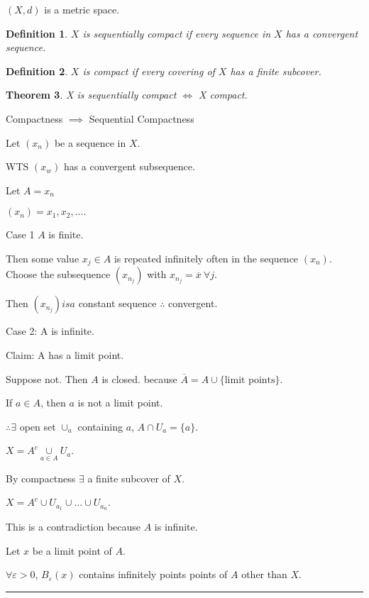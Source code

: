 \documentclass[twoside]{article}
\newcounter{lecnum}
\newtheorem{theorem}{Theorem}[lecnum]
\newtheorem{definition}[theorem]{Definition}
\newenvironment{proof}{{\bf Proof:}}{\hfill\rule{2mm}{2mm}}
\begin{document}
$(X,d)$ is a metric space. 

\begin{definition}
    $X$ is sequentially compact if every sequence in $X$ has a convergent sequence. 
\end{definition}


\begin{definition}
    $X$ is compact if every covering of $X$ has a finite subcover. 
\end{definition}
\begin{theorem}
    X is sequentially compact $\iff$ X compact. 
\end{theorem}

\begin{proof}
    Compactness $\implies$ Sequential Compactness

    Let $(x_n)$ be a sequence in $X$. 

    WTS $(x_w)$ has a convergent subsequence. 

    Let $A = {x_n}$ 
    
    $(x_n) = {x_1, x_2, ....}$

    Case 1 $A$ is finite. 

    Then some value $x_j \in A$ is repeated infinitely often in the sequence $(x_n)$.  Choose the subsequence $ (x_{n_j})$ with $x_{n_j} = \overline x\ \forall j$.

    Then $(x_{n_j}) is a$ constant sequence $\therefore$ convergent. 

    Case 2: A is infinite. 

    Claim: A has a limit point.

    Suppose not. Then $A$ is closed. because $\overline A = A \cup \{\text{limit points}\}$. 
    
    If $a \in A$, then $a$ is not a limit point. 

    $\therefore \exists$ open set $\cup_a$ containing $a$, $A \cap U_a = \{a\}$. 

    $X = A^c \underset{a \in A}\cup U_a$. 

    By compactness $\exists$ a finite subcover of $X$.
    
    $X = A^c \cup U_{a_1} \cup \dots \cup U_{a_n}$. 

    This is a contradiction because $A$ is infinite. 

    Let $x$ be a limit point of $A$. 

    $\forall \varepsilon > 0$, $B_\varepsilon(x)$ contains infinitely points points of $A$ other than $X$.
    

\end{proof}
\end{document}
